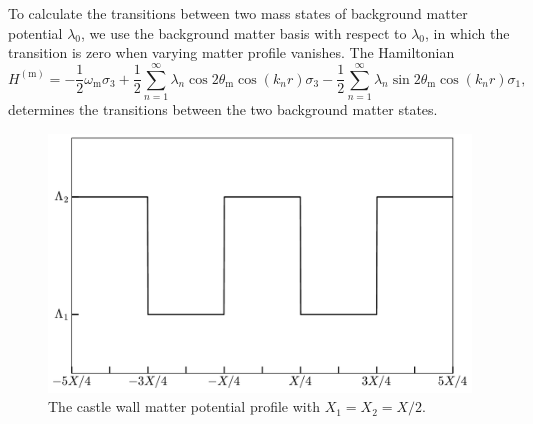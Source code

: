 To calculate the transitions between two mass states of background matter potential $\lambda_0$, we use the background matter basis with respect to $\lambda_0$, in which the transition is zero when varying matter profile vanishes. The Hamiltonian
\begin{equation}
H^{(\mathrm m)} = - \frac{1}{2}\omega_{\mathrm m} \sigma_3  + \frac{1}{2} \sum_{n=1}^{\infty} \lambda_n \cos 2\theta_{\mathrm m} \cos\left( k_n  r \right)  \sigma_3 - \frac{1}{2} \sum_{n=1}^{\infty} \lambda_n \sin 2\theta_{\mathrm m}  \cos\left( k_n r \right) \sigma_1,
\label{castle-wall-decomposed-hamiltonian}
\end{equation}
determines the transitions between the two background matter states.


\begin{figure}[!htbp]
    \centering
    \includegraphics[width=\columnwidth]{chapters/assets/rabi/castlewall-profile}
    \caption{The castle wall matter potential profile with $X_1=X_2=X/2$.}
    \label{fig-castlewall-profile-illustration}
\end{figure}





